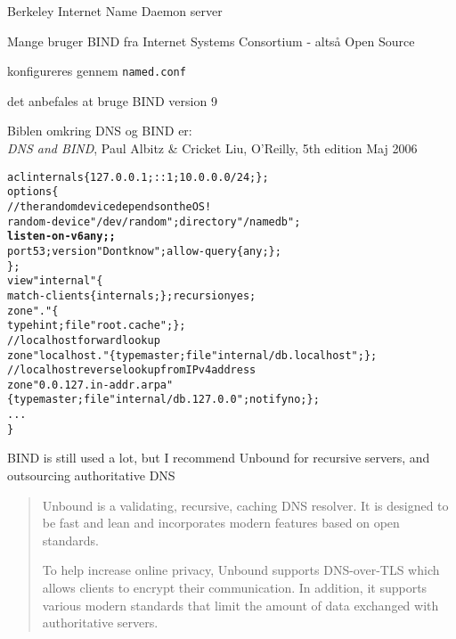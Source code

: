 \documentclass[Screen16to9,17pt]{foils}
\begin{document}

\begin{list1}
\item Berkeley Internet Name Daemon server
\item Mange bruger BIND fra Internet Systems Consortium
   - altså Open Source
\item konfigureres gennem \verb+named.conf+
\item det anbefales at bruge BIND version 9
\end{list1}

\begin{list2}
\item Biblen omkring DNS og BIND er:\\
\emph{DNS and BIND}, Paul Albitz \& Cricket Liu, O'Reilly, 5th
  edition Maj 2006
\end{list2}


\begin{alltt}\tiny
acl internals \{ 127.0.0.1; ::1; 10.0.0.0/24; \};
options \{
        // the random device depends on the OS !
        random-device "/dev/random"; directory "/namedb";
        {\bf listen-on-v6 { any; };}
        port 53; version "Dont know"; allow-query \{ any; \};
\};
view "internal" \{
   match-clients \{ internals; \}; recursion yes;
   zone "." \{
       type hint;   file "root.cache"; \};
   // localhost forward lookup
   zone "localhost." \{ type master; file "internal/db.localhost";   \};
   // localhost reverse lookup from IPv4 address
   zone "0.0.127.in-addr.arpa" \{ type master; file "internal/db.127.0.0"; notify no;   \};
...
\}
\end{alltt}

BIND is still used a lot, but I recommend Unbound for recursive servers, and outsourcing authoritative DNS



\begin{quote}
Unbound is a validating, recursive, caching DNS resolver. It is designed to be fast and lean and incorporates modern features based on open standards.

To help increase online privacy, Unbound supports DNS-over-TLS which allows clients to encrypt their communication. In addition, it supports various modern standards that limit the amount of data exchanged with authoritative servers.
\end{quote}
\end{document}
